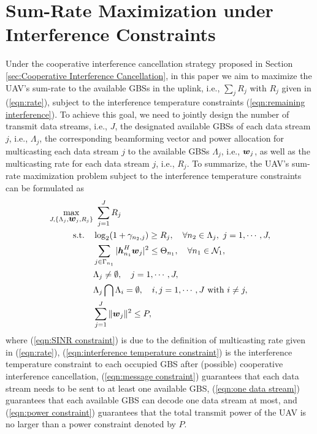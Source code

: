 \documentclass[onecolumn, draftclsnofoot, 12pt]{IEEEtran}
\newcommand{\mv}[1]{\mbox{\boldmath{$ #1 $}}}
\begin{document}
\section{Sum-Rate Maximization under Interference Constraints}\label{sec:UAV Transmission Rate Maximization with Interference Control}
Under the cooperative interference cancellation strategy proposed in Section \ref{sec:Cooperative Interference Cancellation}, in this paper we aim to maximize the UAV's sum-rate to the available GBSs in the uplink, i.e., $\sum_j R_j$ with $R_j$ given in (\ref{eqn:rate}), subject to the interference temperature constraints (\ref{eqn:remaining interference}). To achieve this goal, we need to jointly design the number of transmit data streams, i.e., $J$, the designated available GBSs of each data stream $j$, i.e., $\Lambda_j$, the corresponding beamforming vector and power allocation for multicasting each data stream $j$ to the available GBSs $\Lambda_j$, i.e., $\mv{w}_j$, as well as the multicasting rate for each data stream $j$, i.e., $R_j$. To summarize, the UAV's sum-rate maximization problem subject to the interference temperature constraints can be formulated as
\begin{subequations}\label{eqn:P1}\begin{align}
\mathop{ \underset{J,\{\Lambda_j,\mv{w}_j,R_j\}}{\max}} & ~ \sum\limits_{j=1}^J  R_j \label{eqn:problem}\\
\mathrm{s.t.} \ \ \ & \log_2(1+\gamma_{n_2,j})\geq R_j, ~~~ \forall n_2\in \Lambda_j, ~ j=1,\cdots,J,  \label{eqn:SINR constraint} \\ & \sum\limits_{j\in \Gamma_{n_1}}|\mv{h}_{n_1}^H\mv{w}_j|^2\leq \Theta_{n_1}, ~~~ \forall n_1\in \mathcal{N}_1, \label{eqn:interference temperature constraint} \\ & \Lambda_j\neq \emptyset, ~~~ j=1,\cdots,J, \label{eqn:message constraint} \\ & \Lambda_j\bigcap \Lambda_i =\emptyset, ~~~ i, j=1,\cdots,J ~ {\rm with} ~ i\neq j, \label{eqn:one data stream} \\ & \sum\limits_{j=1}^J\|\mv{w}_j\|^2 \leq P, \label{eqn:power constraint}
\end{align}\end{subequations}where (\ref{eqn:SINR constraint}) is due to the definition of multicasting rate given in (\ref{eqn:rate}), (\ref{eqn:interference temperature constraint}) is the interference temperature constraint to each occupied GBS after (possible) cooperative interference cancellation, (\ref{eqn:message constraint}) guarantees that each data stream needs to be sent to at least one available GBS, (\ref{eqn:one data stream}) guarantees that each available GBS can decode one data stream at most, and (\ref{eqn:power constraint}) guarantees that the total transmit power of the UAV is no larger than a power constraint denoted by $P$.
\end{document}

